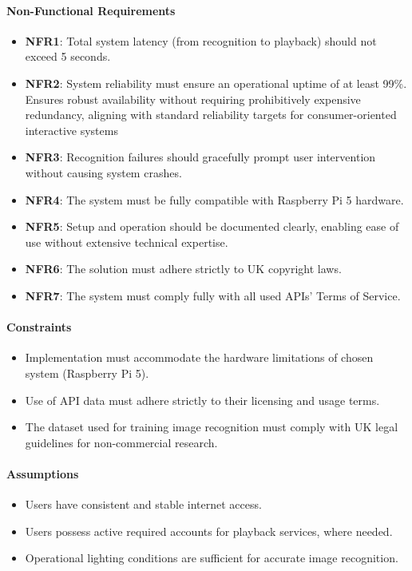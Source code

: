             \paragraph{Non-Functional Requirements}
                \begin{itemize}
                    \item \textbf{NFR1}: Total system latency (from recognition to playback) should not exceed 5 seconds.
                    \item \textbf{NFR2}: System reliability must ensure an operational uptime of at least 99\%. Ensures robust availability without requiring prohibitively expensive redundancy, aligning with standard reliability targets for consumer-oriented interactive systems
                    \item \textbf{NFR3}: Recognition failures should gracefully prompt user intervention without causing system crashes.
                    \item \textbf{NFR4}: The system must be fully compatible with Raspberry Pi 5 hardware.
                    \item \textbf{NFR5}: Setup and operation should be documented clearly, enabling ease of use without extensive technical expertise.
                    \item \textbf{NFR6}: The solution must adhere strictly to UK copyright laws.
                    \item \textbf{NFR7}: The system must comply fully with all used APIs' Terms of Service.
                \end{itemize}
            
            \paragraph{Constraints}
                \begin{itemize}
                    \item Implementation must accommodate the hardware limitations of chosen system (Raspberry Pi 5).
                    \item Use of API data must adhere strictly to their licensing and usage terms.
                    \item The dataset used for training image recognition must comply with UK legal guidelines for non-commercial research.
                \end{itemize}
            
            \paragraph{Assumptions}
                \begin{itemize}
                    \item Users have consistent and stable internet access.
                    \item Users possess active required accounts for playback services, where needed.
                    \item Operational lighting conditions are sufficient for accurate image recognition.
                \end{itemize}
    
